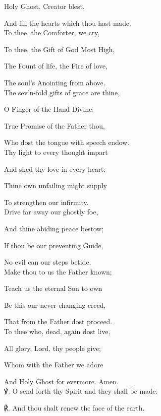 \begin{multicols}{2}
 Holy Ghost, Creator blest,\par
{}
And fill the hearts which thou hast made.\\

To thee, the Comforter, we cry,

To thee, the Gift of God Most High,

The Fount of life, the Fire of love,

The soul's Anointing from above.\\

The sev'n-fold gifts of grace are thine,

O Finger of the Hand Divine;

True Promise of the Father thou,

Who dost the tongue with speech endow.\\

Thy light to every thought impart

And shed thy love in every heart;

Thine own unfailing might supply

To strengthen our infirmity.\\

Drive far away our ghostly foe,

And thine abiding peace bestow;

If thou be our preventing Guide,

No evil can our steps betide.\\

Make thou to us the Father known;

Teach us the eternal Son to own

Be this our never-changing creed,

That from the Father dost proceed.\\

To thee who, dead, again dost live,

All glory, Lord, thy people give;

Whom with the Father we adore

And Holy Ghost for evermore. Amen.\\

℣. O send forth thy Spirit and they shall be made.\par
℟. And thou shalt renew the face of the earth.
\end{multicols}

